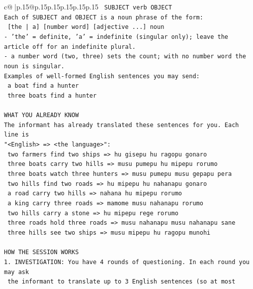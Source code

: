 \documentclass{article}
\begin{document}
{\begin{supertabular}{c@{$\;$}|p{.15\linewidth}@{}p{.15\linewidth}p{.15\linewidth}p{.15\linewidth}p{.15\linewidth}p{.15\linewidth}}
{{{\texttt{    SUBJECT  verb  OBJECT} \\
\texttt{Each of SUBJECT and OBJECT is a noun phrase of the form:} \\
\texttt{    {[}the | a{]}  {[}number word{]}  {[}adjective ...{]}  noun} \\
\texttt{{-} 'the' = definite, 'a' = indefinite (singular only); leave the article off for an indefinite plural.} \\
\texttt{{-} a number word (two, three) sets the count; with no number word the noun is singular.} \\
\texttt{Examples of well{-}formed English sentences you may send:} \\
\texttt{    a boat find a hunter} \\
\texttt{    three boats find a hunter} \\
\\ 
\texttt{WHAT YOU ALREADY KNOW} \\
\texttt{The informant has already translated these sentences for you. Each line is} \\
\texttt{"<English>  =>  <the language>":} \\
\texttt{    two farmers find two ships  =>  hu gisepu hu ragopu gonaro} \\
\texttt{    three boats carry two hills  =>  musu pumepu hu mipepu rorumo} \\
\texttt{    three boats watch three hunters  =>  musu pumepu musu gepapu pera} \\
\texttt{    two hills find two roads  =>  hu mipepu hu nahanapu gonaro} \\
\texttt{    a road carry two hills  =>  nahana hu mipepu rorumo} \\
\texttt{    a king carry three roads  =>  mamome musu nahanapu rorumo} \\
\texttt{    two hills carry a stone  =>  hu mipepu rege rorumo} \\
\texttt{    three roads hold three roads  =>  musu nahanapu musu nahanapu sane} \\
\texttt{    three hills see two ships  =>  musu mipepu hu ragopu munohi} \\
\\ 
\texttt{HOW THE SESSION WORKS} \\
\texttt{1. INVESTIGATION: You have 4 rounds of questioning. In each round you may ask} \\
\texttt{   the informant to translate up to 3 English sentences (so at most} \\
}}}
\end{supertabular}}
\end{document}
